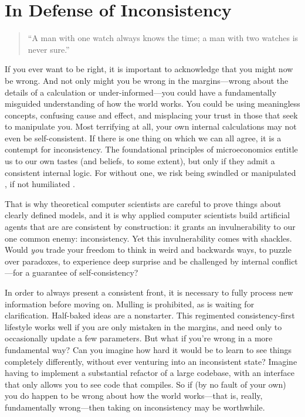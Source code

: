 

\section{In Defense of Inconsistency}

\begin{quotation}
    ``A man with one watch always knows the time;
    a man with two watches is never sure.''
    \\
    \hfill
\end{quotation}

If you ever want to be right, it is important to acknowledge that you might now be wrong.  And not only might you be wrong in the margins---wrong about the details of a calculation or under-informed---you could have a fundamentally misguided understanding of how the world works. You could be using meaningless concepts, confusing cause and effect, and misplacing your trust in those that seek to manipulate you. 
Most terrifying at all, your own internal calculations may not even be self-consistent.
If there is one thing on which we can all agree, it is a contempt for inconsistency.
The foundational principles of microeconomics entitle us to our own tastes (and beliefs, to some extent), but only if they admit a consistent internal logic.
For without one, we risk being swindled \cite{RAT} or manipulated \cite{explosion}, if not humiliated \cite{logicalfalacy,emptysetthesis,politicians}.

That is why theoretical computer scientists are careful to prove things about clearly defined models,
and it is why applied computer scientists build artificial agents that are are consistent by construction:
  it grants an invulnerability to our one common enemy: inconsistency.
%
Yet this invulnerability comes with shackles.
Would \emph{you} trade your freedom to think in weird and backwards ways, to puzzle over paradoxes, to experience deep surprise and be challenged by internal conflict---for a guarantee of self-consistency?

In order to always present a consistent front, it is necessary to fully process new information before moving on. Mulling is prohibited, as
is waiting for clarification.
Half-baked ideas are a nonstarter.
This regimented consistency-first lifestyle works well if you are only mistaken in the margins, and need only to occasionally update a few parameters.
But what if you're wrong in a more fundamental way?
Can you imagine how hard it would be to learn to see things completely differently, without ever venturing into an inconsistent state?
Imagine having to implement a substantial refactor of a large codebase, with an interface that only allows you to see code that compiles.
So if (by no fault of your own) you do happen to be wrong about how the world works---that is, really, fundamentally wrong---then taking on inconsistency may be worthwhile.

